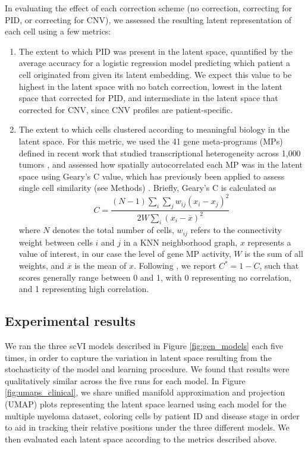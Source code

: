 \documentclass{article}
\begin{document}
In evaluating the effect of each correction scheme (no correction, correcting for PID, or correcting for CNV), we assessed the resulting latent representation of each cell using a few metrics:
\begin{enumerate}
    \item The extent to which PID was present in the latent space, quantified by the average accuracy for a logistic regression model predicting which patient a cell originated from given its latent embedding. We expect this value to be highest in the latent space with no batch correction, lowest in the latent space that corrected for PID, and intermediate in the latent space that corrected for CNV, since CNV profiles are patient-specific.
    \item The extent to which cells clustered according to meaningful biology in the latent space. For this metric, we used the 41 gene meta-programs (MPs) defined in recent work that studied transcriptional heterogeneity across 1,000 tumors \citep{gavish2023hallmarks}, and assessed how spatially autocorrelated each MP was in the latent space using Geary's C value, which has previously been applied to assess single cell similarity (see Methods) \citep{geary1954contiguity, detomaso2019functional}. Briefly, Geary's C is calculated as $$C=\frac{(N-1)\sum _{i}\sum _{j}{w}_{ij}{({x}_{i}-{x}_{j})}^{2}}{2W\sum _{i}{({x}_{i}-\overline{x})}^{2}}$$ where $N$ denotes the total number of cells, $w_{ij}$ refers to the connectivity weight between cells $i$ and $j$ in a KNN neighborhood graph, $x$ represents a value of interest, in our case the level of gene MP activity, $W$ is the sum of all weights, and $\overline{x}$ is the mean of $x$. Following \cite{detomaso2019functional}, we report $C^* = 1-C$, such that scores generally range between 0 and 1, with 0 representing no correlation, and 1 representing high correlation.   
\end{enumerate}

\subsection{Experimental results}

We ran the three scVI models described in Figure \ref{fig:gen_models} each five times, in order to capture the variation in latent space resulting from the stochasticity of the model and learning procedure. We found that results were qualitatively similar across the five runs for each model. In Figure \ref{fig:umaps_clinical}, we share unified manifold approximation and projection (UMAP) plots representing the latent space learned using each model for the multiple myeloma dataset, coloring cells by patient ID and disease stage in order to aid in tracking their relative positions under the three different models. We then evaluated each latent space according to the metrics described above.
\end{document}
